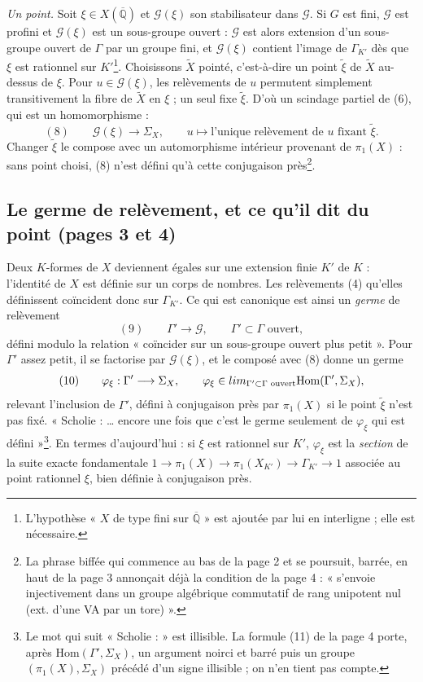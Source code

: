 \documentclass[11pt,a4paper]{article}
\begin{document}
\emph{Un point.} Soit $\xi \in X(\overline{\mathbb{Q}})$ et
$\mathcal{G}(\xi)$ son stabilisateur dans $\mathcal{G}$. Si $G$ est fini,
$\mathcal{G}$ est profini et $\mathcal{G}(\xi)$ est un sous-groupe ouvert :
$\mathcal{G}$ est alors extension d'un sous-groupe ouvert de $\Gamma$ par un
groupe fini, et $\mathcal{G}(\xi)$ contient l'image de $\Gamma_{K'}$ dès que
$\xi$ est rationnel sur $K'$\footnote{L'hypothèse « $X$ de type fini sur
$\overline{\mathbb{Q}}$ » est ajoutée par lui en interligne ; elle est
nécessaire.}. Choisissons $\widetilde X$ pointé, c'est-à-dire un point
$\tilde\xi$ de $\widetilde X$ au-dessus de $\xi$. Pour $u \in \mathcal{G}(\xi)$,
les relèvements de $u$ permutent simplement transitivement la fibre de
$\widetilde X$ en $\xi$ ; un seul fixe $\tilde\xi$. D'où un scindage partiel
de (6), qui est un homomorphisme :
\[
(8)\qquad \mathcal{G}(\xi) \longrightarrow \Sigma_X, \qquad u \longmapsto
\text{l'unique relèvement de } u \text{ fixant } \tilde\xi .
\]
Changer $\tilde\xi$ le compose avec un automorphisme intérieur provenant de
$\pi_1(X)$ : sans point choisi, (8) n'est défini qu'à cette conjugaison
près\footnote{La phrase biffée qui commence au bas de la page 2 et se
poursuit, barrée, en haut de la page 3 annonçait déjà la condition de la page
4 : « s'envoie injectivement dans un groupe algébrique commutatif de rang
unipotent nul (ext. d'une VA par un tore) ».}.

\subsection*{Le germe de relèvement, et ce qu'il dit du point (pages 3 et 4)}

Deux $K$-formes de $X$ deviennent égales sur une extension finie $K'$ de
$K$ : l'identité de $X$ est définie sur un corps de nombres. Les relèvements
(4) qu'elles définissent coïncident donc sur $\Gamma_{K'}$. Ce qui est
canonique est ainsi un \emph{germe} de relèvement
\[
(9)\qquad \Gamma' \longrightarrow \mathcal{G}, \qquad \Gamma' \subset \Gamma
\text{ ouvert},
\]
défini modulo la relation « coïncider sur un sous-groupe ouvert plus petit ».
Pour $\Gamma'$ assez petit, il se factorise par $\mathcal{G}(\xi)$, et le
composé avec (8) donne un germe
\[
(10)\qquad \varphi_\xi : \Gamma' \longrightarrow \Sigma_X, \qquad
\varphi_\xi \in \varinjlim_{\Gamma' \subset \Gamma \text{ ouvert}}
\mathrm{Hom}(\Gamma', \Sigma_X),
\]
relevant l'inclusion de $\Gamma'$, défini à conjugaison près par
$\pi_1(X)$ si le point $\tilde\xi$ n'est pas fixé. « Scholie : … encore une
fois que c'est le germe seulement de $\varphi_\xi$ qui est
défini »\footnote{Le mot qui suit « Scholie : » est illisible. La formule (11)
de la page 4 porte, après $\mathrm{Hom}(\Gamma', \Sigma_X)$, un argument
noirci et barré puis un groupe $(\pi_1(X), \Sigma_X)$ précédé d'un signe
illisible ; on n'en tient pas compte.}. En termes d'aujourd'hui :
si $\xi$ est rationnel sur $K'$, $\varphi_\xi$ est la \emph{section} de la suite
exacte fondamentale $1 \to \pi_1(X) \to \pi_1(X_{K'}) \to \Gamma_{K'} \to 1$
associée au point rationnel $\xi$, bien définie à conjugaison près.
\end{document}
